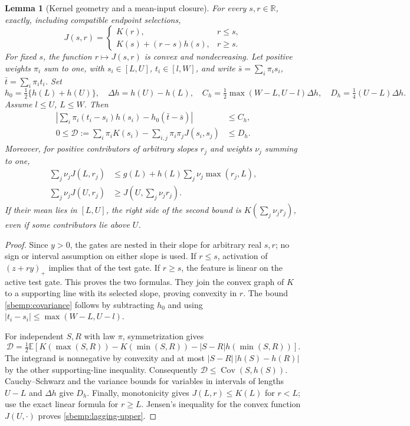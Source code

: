 \documentclass{article} %
\theoremstyle{plain}
\newtheorem{lemma}[theorem]{Lemma}
\theoremstyle{definition}
\theoremstyle{remark}
\begin{document}
\begin{lemma}[Kernel geometry and a mean-input closure]
\label{sbemp:kernel}
For every $s,r\in\mathbb R$, exactly, including compatible endpoint
selections,
\[
 J(s,r)=
 \begin{cases}K(r),&r\le s,\\
 K(s)+(r-s)h(s),&r\ge s.
 \end{cases}
\]
For fixed $s$, the function $r\mapsto J(s,r)$ is convex and nondecreasing.
Let positive weights $\pi_i$ sum to one, with
$s_i\in[L,U]$, $t_i\in[l,W]$, and write
$\bar s=\sum_i\pi_i s_i$, $\bar t=\sum_i\pi_i t_i$.
Set
\[
 h_0=\tfrac12\{h(L)+h(U)\},\quad \Delta h=h(U)-h(L),\quad
 C_h=\tfrac12\max(W-L,U-l)\Delta h,\quad
 D_h=\tfrac14(U-L)\Delta h.
\]
Assume $l\le U$, $L\le W$. Then
\begin{align}
 \left|\sum_i\pi_i(t_i-s_i)h(s_i)-h_0(\bar t-\bar s)\right|
       &\le C_h,\label{sbemp:covariance}\\
 0\le\mathcal D:=\sum_i\pi_iK(s_i)
       -\sum_{i,j}\pi_i\pi_jJ(s_i,s_j)&\le D_h.
 \label{sbemp:defect}
\end{align}
Moreover, for positive contributors of arbitrary slopes $r_j$ and weights
$\nu_j$ summing to one,
\begin{align}
 \sum_j\nu_jJ(L,r_j)&\le g(L)+h(L)\sum_j\nu_j\max(r_j,L),
 \label{sbemp:lagging-lower}\\
 \sum_j\nu_jJ(U,r_j)&\ge J(U,\textstyle\sum_j\nu_j r_j).
 \label{sbemp:lagging-upper}
\end{align}
If their mean lies in $[L,U]$, the right side of the second bound is
$K(\sum_j\nu_jr_j)$, even if some contributors lie above $U$.
\end{lemma}
\begin{proof}
Since $y>0$, the gates are nested in their slope for arbitrary real
$s,r$; no sign or interval assumption on either slope is used. If $r\le s$,
activation of $(z+ry)_+$ implies that of the test gate. If $r\ge s$,
the feature is linear on the active test gate. This proves the two formulas.
They join the convex graph of $K$ to a supporting line with its selected
slope, proving convexity in $r$.
The bound \eqref{sbemp:covariance} follows by subtracting $h_0$ and using
$|t_i-s_i|\le\max(W-L,U-l)$.

For independent $S,R$ with law $\pi$, symmetrization gives
\[
 \mathcal D=\tfrac12\mathbb E\left[
 K(\max(S,R))-K(\min(S,R))
 -|S-R|h(\min(S,R))\right].
\]
The integrand is nonnegative by convexity and at most
$|S-R|\,|h(S)-h(R)|$ by the other supporting-line inequality.
Consequently $\mathcal D\le\operatorname{Cov}(S,h(S))$.
Cauchy--Schwarz and the variance bounds for variables in intervals of
lengths $U-L$ and $\Delta h$ give $D_h$.
Finally, monotonicity gives $J(L,r)\le K(L)$ for $r<L$; use the exact
linear formula for $r\ge L$. Jensen's inequality for the convex function
$J(U,\cdot)$ proves \eqref{sbemp:lagging-upper}.
\end{proof}
\end{document}
